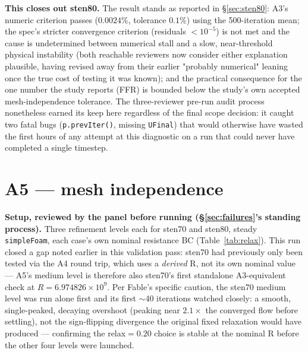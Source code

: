 \documentclass[11pt]{article}
\begin{document}
\textbf{This closes out sten80.} The result stands as reported in \S\ref{sec:sten80}: A3's numeric
criterion passes ($0.0024\%$, tolerance $0.1\%$) using the 500-iteration mean; the spec's stricter
convergence criterion (residuals $<10^{-5}$) is not met and the cause is undetermined between
numerical stall and a slow, near-threshold physical instability (both reachable reviewers now
consider either explanation plausible, having revised away from their earlier "probably numerical"
leaning once the true cost of testing it was known); and the practical consequence for the one number
the study reports (FFR) is bounded below the study's own accepted mesh-independence tolerance. The
three-reviewer pre-run audit process nonetheless earned its keep here regardless of the final
scope decision: it caught two fatal bugs (\texttt{p.prevIter()}, missing \texttt{UFinal}) that would
otherwise have wasted the first hours of any attempt at this diagnostic on a run that could never have
completed a single timestep.

\section{A5 --- mesh independence}
\label{sec:a5}
\textbf{Setup, reviewed by the panel before running (\S\ref{sec:failures}'s standing process).} Three
refinement levels each for sten70 and sten80, steady \texttt{simpleFoam}, each case's own nominal
resistance BC (Table~\ref{tab:relax}). This run closed a gap noted earlier in this validation pass:
sten70 had previously only been tested via the A4 round trip, which uses a \emph{derived} R, not its
own nominal value --- A5's medium level is therefore also sten70's first standalone A3-equivalent
check at $R=6.974826\times10^9$. Per Fable's specific caution, the sten70 medium level was run alone
first and its first $\sim$40 iterations watched closely: a smooth, single-peaked, decaying overshoot
(peaking near $2.1\times$ the converged flow before settling), not the sign-flipping divergence the
original fixed relaxation would have produced --- confirming the relax$=0.20$ choice is stable at the
nominal R before the other four levels were launched.
\end{document}
